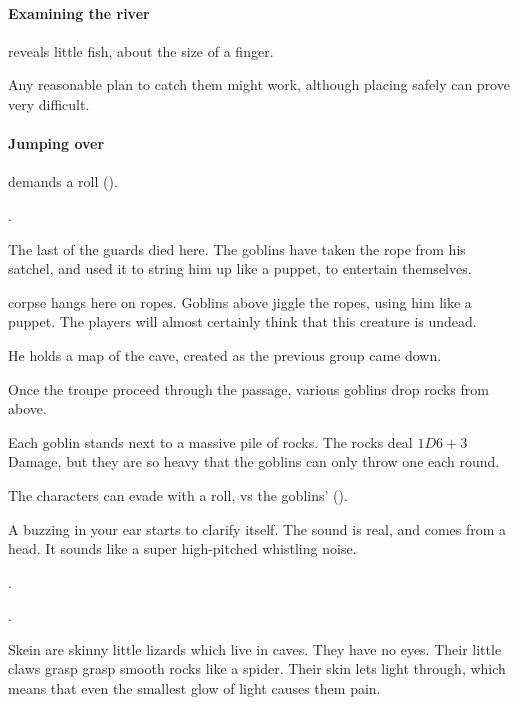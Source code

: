 \begin{multicols}{2}
\paragraph{Examining the river}
reveals little fish, about the size of a finger.

Any reasonable plan to catch them might work, although placing  safely can prove very difficult.

\paragraph{Jumping over}
demands a  roll (\tn[12]).

.


\begin{exampletext}
  The last of the \glspl{guard} died here.
  The goblins have taken the rope from his satchel, and used it to string him up like a puppet, to entertain themselves.
\end{exampletext}

 corpse hangs here on ropes.
Goblins above jiggle the ropes, using him like a puppet.
The players will almost certainly think that this creature is undead.

He holds a map of the cave, created as the previous group came down.

Once the troupe proceed through the passage, various goblins drop rocks from above.


Each goblin stands next to a massive pile of rocks.
The rocks deal $1D6+3$ Damage, but they are so heavy that the goblins can only throw one each round.

The characters can evade with a  roll, vs the goblins'  (\tn).

\begin{boxtext}
  A buzzing in your ear starts to clarify itself.
  The sound is real, and comes from a head.
  It sounds like a super high-pitched whistling noise.
\end{boxtext}

.

.


Skein are skinny little lizards which live in caves.
They have no eyes.
Their little claws grasp grasp smooth rocks like a spider.
Their skin lets light through, which means that even the smallest glow of light causes them pain.


\end{multicols}
